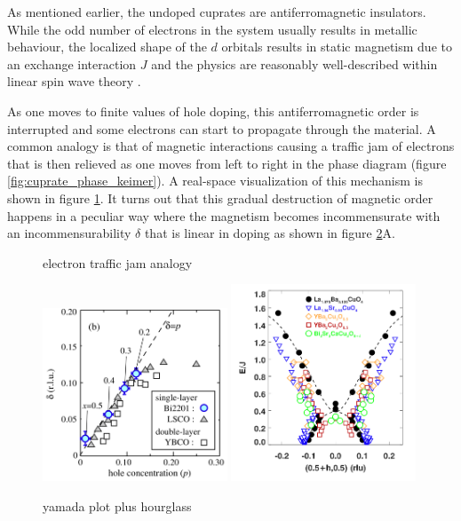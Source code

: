 As mentioned earlier, the undoped cuprates are antiferromagnetic insulators. While the odd number of electrons in the system usually results in metallic behaviour, the localized shape of the $d$ orbitals results in static magnetism due to an exchange interaction $J$ and the physics are reasonably well-described within linear spin wave theory \cite{Headings2010}.

As one moves to finite values of hole doping, this antiferromagnetic order is interrupted and some electrons can start to propagate through the material. A common analogy is that of magnetic interactions causing a traffic jam of electrons that is then relieved as one moves from left to right in the phase diagram (figure \ref{fig:cuprate_phase_keimer}). A real-space visualization of this mechanism is shown in figure \ref{fig:electron_traffic_jam}. It turns out that this gradual destruction of magnetic order happens in a peculiar way where the magnetism becomes incommensurate with an incommensurability $\delta$ that is linear in doping as shown in figure \ref{fig:yamada_plot}A.

\begin{figure}
    \centering
    \caption[electron traffic jam analogy]{electron traffic jam analogy}
    \label{fig:electron_traffic_jam}
\end{figure}

\begin{figure}
    \centering
    \includegraphics[width=0.49\textwidth]{fig/intro/enoki_plot.png}
    \includegraphics[width=0.49\textwidth]{fig/intro/hourglass.png}
    \caption[yamada plot plus hourglass]{yamada plot plus hourglass}
    \label{fig:yamada_plot}
\end{figure}

